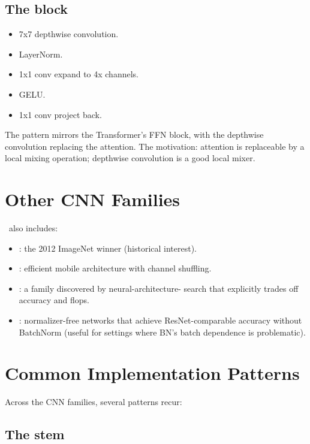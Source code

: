 \subsection{The block}
\label{ssec:vision_cnn:convnext_block}

\begin{itemize}
  \item 7x7 depthwise convolution.
  \item LayerNorm.
  \item 1x1 conv expand to 4x channels.
  \item GELU.
  \item 1x1 conv project back.
\end{itemize}

The pattern mirrors the Transformer's FFN block, with the
depthwise convolution replacing the attention. The motivation:
attention is replaceable by a local mixing operation; depthwise
convolution is a good local mixer.

\section{Other CNN Families}
\label{sec:vision_cnn:others}

\Lucid\ also includes:

\begin{itemize}
  \item {}: the 2012 ImageNet winner (historical
    interest).
  \item {}: efficient mobile architecture with
    channel shuffling.
  \item {}: a family discovered by neural-architecture-
    search that explicitly trades off accuracy and flops.
  \item {}: normalizer-free networks that achieve
    ResNet-comparable accuracy without BatchNorm (useful for
    settings where BN's batch dependence is problematic).
\end{itemize}

\section{Common Implementation Patterns}
\label{sec:vision_cnn:patterns}

Across the CNN families, several patterns recur:

\subsection{The stem}
\label{ssec:vision_cnn:stem}

